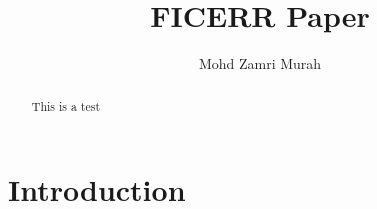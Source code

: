 \documentclass[12pt]{article}
\begin{document}
\title{FICERR Paper}
\author{Mohd Zamri Murah}
\maketitle

\begin{abstract}
    This is a test
\end{abstract}

\section*{Introduction}


\nocite{*}


\end{document}
